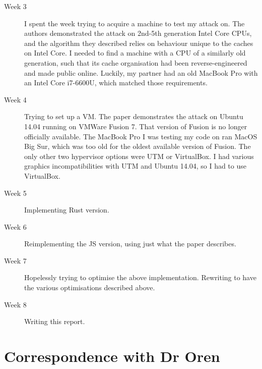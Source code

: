 \documentclass[a4paper,10pt,twocolumn]{article}
\theoremstyle{definition}
\begin{document}
\begin{description}
\item[Week 3]
  I spent the week trying to acquire a machine to test my attack on.
  The authors demonstrated the attack on 2nd-5th generation Intel Core
  CPUs, and the algorithm they described relies on behaviour unique to the
  caches on Intel Core.
  I needed to find a machine with a CPU of a similarly old generation, such that
  its cache organisation had been reverse-engineered and made public online.
  Luckily, my partner had an old MacBook Pro with an Intel Core i7-6600U, which
  matched those requirements.
\item[Week 4]
  Trying to set up a VM.
  The paper demonstrates the attack on Ubuntu 14.04 running on VMWare Fusion 7.
  That version of Fusion is no longer officially available.
  The MacBook Pro I was testing my code on ran MacOS Big Sur, which was too old
  for the oldest available version of Fusion.
  The only other two hypervisor options were UTM or VirtualBox.
  I had various graphics incompatibilities with UTM and Ubuntu 14.04, so I had
  to use VirtualBox.
\item[Week 5]
  Implementing Rust version.
\item[Week 6]
  Reimplementing the JS version, using just what the paper describes.
\item [Week 7]
  Hopelessly trying to optimise the above implementation.
  Rewriting to have the various optimisations described above.
\item [Week 8]
  Writing this report.
\end{description}

\section{Correspondence with Dr Oren}
\end{document}
